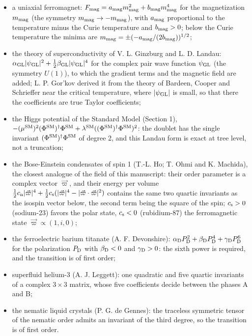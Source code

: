 \documentclass[
  10pt,
]{article}
\providecommand{\tightlist}{%
  \setlength{\itemsep}{0pt}\setlength{\parskip}{0pt}}
\begin{document}
\begin{itemize}
\tightlist
\item
  a uniaxial ferromagnet:
  \(F_{\rm mag}=a_{\rm mag}m_{\rm mag}^2+b_{\rm mag}m_{\rm mag}^4\) for
  the magnetization \(m_{\rm mag}\) (the symmetry
  \(m_{\rm mag}\to-m_{\rm mag}\)), with \(a_{\rm mag}\) proportional to
  the temperature minus the Curie temperature and \(b_{\rm mag}>0\);
  below the Curie temperature the minima are
  \(m_{\rm mag}=\pm(-a_{\rm mag}/(2b_{\rm mag}))^{1/2}\);
\item
  the theory of superconductivity of V. L. Ginzburg and L. D. Landau:
  \(\alpha_{\rm GL}\lvert\psi_{\rm GL}\rvert^2+\tfrac12\beta_{\rm GL}\lvert\psi_{\rm GL}\rvert^4\)
  for the complex pair wave function \(\psi_{\rm GL}\) (the symmetry
  \(U(1)\)), to which the gradient terms and the magnetic field are
  added; L. P. Gor'kov derived it from the theory of Bardeen, Cooper and
  Schrieffer near the critical temperature, where
  \(\lvert\psi_{\rm GL}\rvert\) is small, so that there the coefficients
  are true Taylor coefficients;
\item
  the Higgs potential of the Standard Model (Section 1),
  \(-(\mu^{\rm SM})^2(\Phi^{\rm SM})^\dagger\Phi^{\rm SM}+\lambda^{\rm SM}((\Phi^{\rm SM})^\dagger\Phi^{\rm SM})^2\):
  the doublet has the single invariant
  \((\Phi^{\rm SM})^\dagger\Phi^{\rm SM}\) of degree 2, and this Landau
  form is exact at tree level, not a truncation;
\item
  the Bose-Einstein condensates of spin 1 (T.-L. Ho; T. Ohmi and K.
  Machida), the closest analogue of the field of this manuscript: their
  order parameter is a complex vector \(\vec\varpi\), and their energy
  per volume
  \(\tfrac12c_{\rm n}\lvert\vec\varpi\rvert^4+\tfrac12c_{\rm s}(\lvert\vec\varpi\rvert^4-\lvert\vec\varpi\cdot\vec\varpi\rvert^2)\)
  contains the same two quartic invariants as the isospin vector below,
  the second term being the square of the spin; \(c_{\rm s}>0\)
  (sodium-23) favors the polar state, \(c_{\rm s}<0\) (rubidium-87) the
  ferromagnetic state \(\vec\varpi\propto(1,i,0)\);
\item
  the ferroelectric barium titanate (A. F. Devonshire):
  \(\alpha_{\rm D}P_{\rm D}^2+\beta_{\rm D}P_{\rm D}^4+\gamma_{\rm D}P_{\rm D}^6\)
  for the polarization \(P_{\rm D}\) with \(\beta_{\rm D}<0\) and
  \(\gamma_{\rm D}>0\): the sixth power is required, and the transition
  is of first order;
\item
  superfluid helium-3 (A. J. Leggett): one quadratic and five quartic
  invariants of a complex \(3\times3\) matrix, whose five coefficients
  decide between the phases A and B;
\item
  the nematic liquid crystals (P. G. de Gennes): the traceless symmetric
  tensor of the nematic order admits an invariant of the third degree,
  so the transition is of first order.
\end{itemize}
\end{document}
